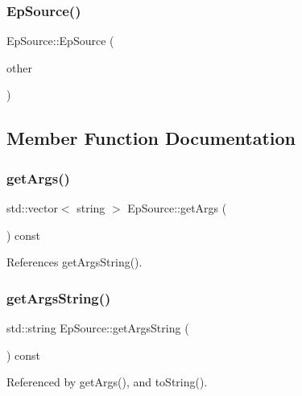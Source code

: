 \mbox{\label{classEpSource_ad864cc732e96dac5210e1ec703a863b4}} 
\subsubsection{Ep\+Source()\hspace{0.1cm}{\footnotesize\ttfamily [3/3]}}
{\footnotesize\ttfamily Ep\+Source\+::\+Ep\+Source (\begin{DoxyParamCaption}\item[{const \textbf{ Ep\+Source} \&}]{other }\end{DoxyParamCaption})}



\subsection{Member Function Documentation}
\mbox{\label{classEpSource_a4ceeafa8be0982d354ae4f48ffa4c8c7}} 
\subsubsection{get\+Args()}
{\footnotesize\ttfamily std\+::vector$<$ string $>$ Ep\+Source\+::get\+Args (\begin{DoxyParamCaption}{ }\end{DoxyParamCaption}) const}



References get\+Args\+String().

\mbox{\label{classEpSource_a326fec362bb4eb57b5bb48cc4ed49cc5}} 
\subsubsection{get\+Args\+String()}
{\footnotesize\ttfamily std\+::string Ep\+Source\+::get\+Args\+String (\begin{DoxyParamCaption}{ }\end{DoxyParamCaption}) const}



Referenced by get\+Args(), and to\+String().

\mbox{\label{classEpSource_a9f683f46d4eccd3b2188641aa428af5e}} 
